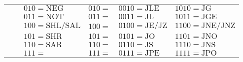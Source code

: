 \begin{frame}
\begin{table}[]
{\begin{tabular}{|l|l||l|l|l|l|}
                                                  &                                          & $010=\text{NEG}$ & $010=$ & $0010=\text{JLE}$ & $1010=\text{JG}$ \\ \cline{3-6}
                                                  &                                          & $011=\text{NOT}$ & $011=$ & $0011=\text{JL}$ & $1011=\text{JGE}$ \\ \cline{3-6}
                                                  &                                          & $100=\text{SHL/SAL}$ & $100=$ & $0100=\text{JE/JZ}$ & $1100=\text{JNE/JNZ}$ \\ \cline{3-6}
                                                  &                                          & $101=\text{SHR}$ & $101=$ & $0101=\text{JO}$ & $1101=\text{JNO}$ \\ \cline{3-6}
                                                  &                                          & $110=\text{SAR}$ & $110=$ & $0110=\text{JS}$ & $1110=\text{JNS}$ \\ \cline{3-6}
                                                  &                                          & $111=$ & $111=$ & $0111=\text{JPE}$ & $1111=\text{JPO}$ \\ \hline

            \end{tabular}
        }
    \end{table}
    

\end{frame}


